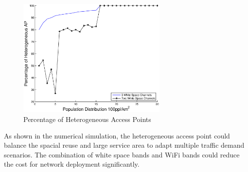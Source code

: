\begin{figure}
\centering
\includegraphics[width=74mm]{figures/percentage}
\vspace{-0.1in}
\caption{Percentage of Heterogeneous Access Points}                                                                 
\label{fig:heappercentage}
\vspace{-0.1in}
\end{figure}

As shown in the numerical simulation, the heterogeneous access point could balance
the spacial reuse and large service area to adapt multiple traffic demand scenarios.
The combination of white space bands and WiFi bands could reduce the cost for
network deployment significantly.






